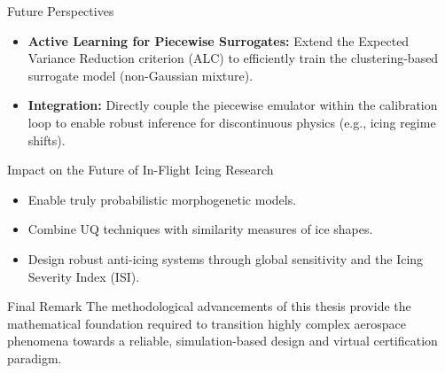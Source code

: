 \begin{frame}{Future Perspectives}
    \begin{itemize}
        \item \textbf{Active Learning for Piecewise Surrogates:} Extend the Expected Variance Reduction criterion (ALC) to efficiently train the clustering-based surrogate model (non-Gaussian mixture).
        \item \textbf{Integration:} Directly couple the piecewise emulator within the calibration loop to enable robust inference for discontinuous physics (e.g., icing regime shifts).
    \end{itemize}
    \vspace{0.5cm}
    \begin{center}
    \end{center}
\end{frame}

\begin{frame}{Impact on the Future of In-Flight Icing Research}
    \begin{itemize}
        \item Enable truly probabilistic morphogenetic models.
        \item Combine UQ techniques with similarity measures of ice shapes.
        \item Design robust anti-icing systems through global sensitivity and the Icing Severity Index (ISI).
    \end{itemize}
    \vspace{0.5cm}
    \begin{block}{Final Remark}
        The methodological advancements of this thesis provide the mathematical foundation required to transition highly complex aerospace phenomena towards a reliable, simulation-based design and virtual certification paradigm.
    \end{block}
\end{frame}
